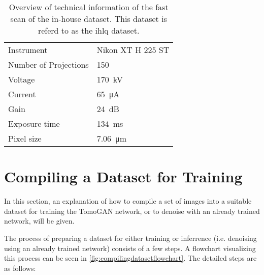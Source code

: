 \begin{table}[htbp]
    \centering
    \caption[Technical information of the IHLQ dataset]{Overview of technical information of the fast scan of the in-house dataset. This dataset is referd to as the \acrshort{ihlq} dataset. }
    \label{tab:inhouselq}
    \begin{tabular}{ll}
    \hline
    Instrument & Nikon XT H 225 ST \\
    Number of Projections & 150 \\
    Voltage & \SI{170}{\kilo \volt}\\
    Current & \SI{65}{\micro \ampere}\\
    Gain & \SI{24}{\deci \bel}\\
    Exposure time & \SI{134}{\milli \second}\\
    Pixel size & \SI{7.06}{\micro \meter} \\
    \hline
    \end{tabular}
\end{table}

\section{Compiling a Dataset for Training}
\label{sec:method:compilingdataset}
In this section, an explanation of how to compile a set of images into a suitable dataset for training the TomoGAN network, or to denoise with an already trained network, will be given. 

The process of preparing a dataset for either training or inferrence (i.e. denoising using an already trained network) consists of a few steps. A flowchart visualizing this process can be seen in \cref{fig:compilingdatasetflowchart}. The detailed steps are as follows:

